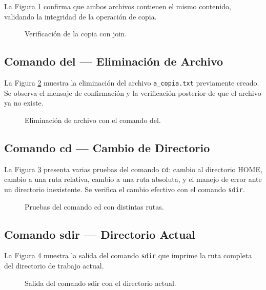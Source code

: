         La Figura \ref{fig:copy_verif} confirma que ambos archivos contienen el mismo contenido, validando la integridad de la operación de copia.
        \begin{figure}[!h]
            \centering
            \caption{Verificación de la copia con join.}
            \label{fig:copy_verif}
        \end{figure}

    \subsection{Comando del — Eliminación de Archivo}
        La Figura \ref{fig:del} muestra la eliminación del archivo \texttt{a\_copia.txt} previamente creado. Se observa el mensaje de confirmación y la verificación posterior de que el archivo ya no existe.
        \begin{figure}[!h]
            \centering
            \caption{Eliminación de archivo con el comando del.}
            \label{fig:del}
        \end{figure}

    \subsection{Comando cd — Cambio de Directorio}
        La Figura \ref{fig:cd} presenta varias pruebas del comando \texttt{cd}: cambio al directorio HOME, cambio a una ruta relativa, cambio a una ruta absoluta, y el manejo de error ante un directorio inexistente. Se verifica el cambio efectivo con el comando \texttt{sdir}.
        \begin{figure}[!h]
            \centering
            \caption{Pruebas del comando cd con distintas rutas.}
            \label{fig:cd}
        \end{figure}

    \subsection{Comando sdir — Directorio Actual}
        La Figura \ref{fig:sdir} muestra la salida del comando \texttt{sdir} que imprime la ruta completa del directorio de trabajo actual.
        \begin{figure}[!h]
            \centering
            \caption{Salida del comando sdir con el directorio actual.}
            \label{fig:sdir}
        \end{figure}

